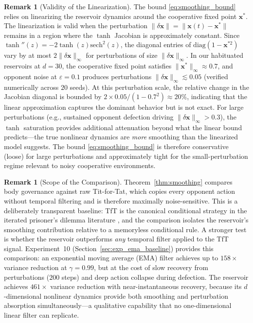 \documentclass[11pt,a4paper]{article}
\theoremstyle{definition}
\newtheorem{remark}[theorem]{Remark}
\newcommand{\xstate}{\mathbf{x}}
\begin{document}
\begin{remark}[Validity of the Linearization]
\label{rem:linearization}
The bound \eqref{eq:smoothing_bound} relies on linearizing the
reservoir dynamics around the cooperative fixed point $\xstate^{*}$.
The linearization is valid when the perturbation
$\|\delta\xstate\| = \|\xstate(t) - \xstate^{*}\|$ remains in a region
where the $\tanh$ Jacobian is approximately constant.
Since $\tanh''(z) = -2\tanh(z)\mathrm{sech}^2(z)$, the diagonal
entries of $\mathrm{diag}(1 - \xstate^{*2})$ vary by at most
$2\|\delta\xstate\|_\infty$ for perturbations of size
$\|\delta\xstate\|_\infty$.
In our habituated reservoirs at $d = 30$, the cooperative fixed point
satisfies $\|\xstate^{*}\|_\infty \approx 0.7$, and
opponent noise at $\varepsilon = 0.1$ produces perturbations
$\|\delta\xstate\|_\infty \lesssim 0.05$ (verified numerically across $20$
seeds).  At this perturbation scale, the relative change in the Jacobian
diagonal is bounded by $2 \times 0.05 / (1 - 0.7^2) \approx 20\%$,
indicating that the linear approximation captures the dominant behavior
but is not exact.  For large perturbations (e.g., sustained opponent
defection driving $\|\delta\xstate\|_\infty > 0.3$), the $\tanh$
saturation provides additional attenuation beyond what the linear bound
predicts---the true nonlinear dynamics are \emph{more} smoothing than
the linearized model suggests.  The bound \eqref{eq:smoothing_bound}
is therefore conservative (loose) for large perturbations and
approximately tight for the small-perturbation regime relevant to
noisy cooperative environments.
\end{remark}

\begin{remark}[Scope of the Comparison]
\label{rem:comparison_scope}
Theorem~\ref{thm:smoothing} compares body governance against raw
Tit-for-Tat, which copies every opponent action without temporal
filtering and is therefore maximally noise-sensitive.  This is a
deliberately transparent baseline: TfT is the canonical conditional
strategy in the iterated prisoner's dilemma literature
\citep{axelrod1984}, and the comparison isolates the reservoir's
smoothing contribution relative to a memoryless conditional rule.
A stronger test is whether the reservoir outperforms \emph{any}
temporal filter applied to the TfT signal.
Experiment~10 (Section~\ref{sec:exp_ema_baseline}) provides this
comparison: an exponential moving average (EMA) filter achieves up
to $158\times$ variance reduction at $\gamma = 0.99$, but at the
cost of slow recovery from perturbations ($200$ steps) and deep
action collapse during defection.  The reservoir achieves
$461\times$ variance reduction with near-instantaneous recovery,
because its $d$-dimensional nonlinear dynamics provide both
smoothing and perturbation absorption simultaneously---a
qualitative capability that no one-dimensional linear filter
can replicate.
\end{remark}
\end{document}
